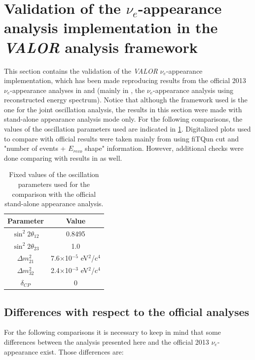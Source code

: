 \clearpage

\section {Validation of the $\nu_{e}$-appearance analysis implementation in the {\em VALOR} analysis framework}
\label{app:standalone}

This section contains the validation of the {\em VALOR} $\nu_{e}$-appearance implementation, which has been made reproducing results from the official 2013 $\nu_{e}$-appearance analyses in \cite{2013nueptheta} and \cite{2013nuenergy} (mainly in \cite{2013nuenergy}, the $\nu_{e}$-appearance analysis using reconstructed energy spectrum). 
Notice that although the framework used is the one for the joint oscillation analysis, the results in this section
were made with stand-alone appearance analysis mode only. 
For the following comparisons, the values of the oscillation parameters used are indicated in \ref{tab:app:nue:fixedvalues}. Digitalized plots used to compare with official results were taken mainly from \cite{2013nuenergy} using fiTQun cut and "number of events + $E_{reco}$ shape" information. However, additional checks were done comparing with results in \cite{2013nueptheta} as well.

\begin{table}[h]
\centering
\begin{tabular}{|c|c|}
\hline
Parameter & Value \\
\hline
\hline
$\sin^{2}2\theta_{12}$ & 0.8495 \\
\hline 
$\sin^{2}2\theta_{23}$ & 1.0 \\
\hline 
$\Delta m_{21}^{2}$ & 7.6$\times$10$^{-5}$ eV$^{2}$/c$^{4}$ \\
\hline
$\Delta m_{32}^{2}$ & 2.4$\times$10$^{-3}$ eV$^{2}$/c$^{4}$ \\
\hline
$\delta_{CP}$ & 0\\
\hline
\end{tabular}
\caption{Fixed values of the oscillation parameters used for the comparison with the official stand-alone appearance analysis.}
\label{tab:app:nue:fixedvalues}
\end{table}

\subsection{Differences with respect to the official analyses}

For the following comparisons it is necessary to keep in mind that some differences between the analysis presented here and the official 2013 $\nu_{e}$-appearance exist. Those differences are:

